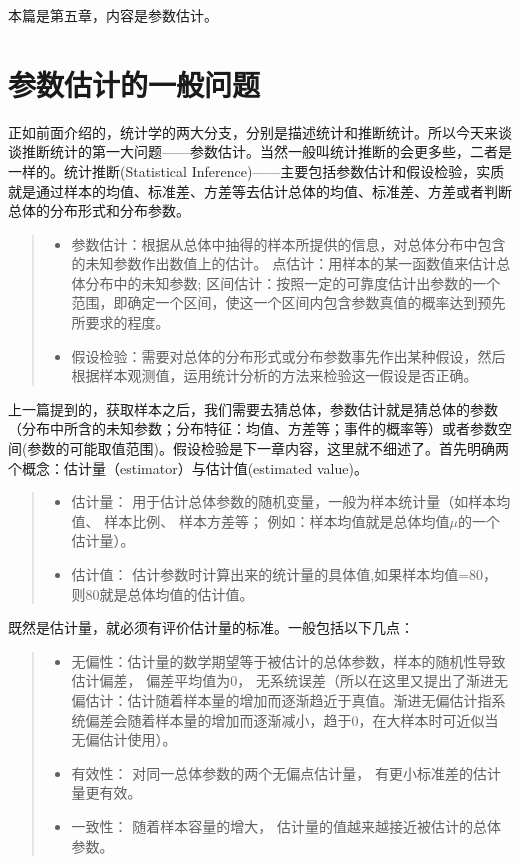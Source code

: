 \documentclass[]{ctexbook}
\providecommand{\tightlist}{%
  \setlength{\itemsep}{0pt}\setlength{\parskip}{0pt}}
\begin{document}
本篇是第五章，内容是参数估计。

\hypertarget{ux53c2ux6570ux4f30ux8ba1ux7684ux4e00ux822cux95eeux9898}{%
\section{参数估计的一般问题}\label{ux53c2ux6570ux4f30ux8ba1ux7684ux4e00ux822cux95eeux9898}}

正如前面介绍的，统计学的两大分支，分别是描述统计和推断统计。所以今天来谈谈推断统计的第一大问题------参数估计。当然一般叫统计推断的会更多些，二者是一样的。统计推断(Statistical Inference)------主要包括参数估计和假设检验，实质就是通过样本的均值、标准差、方差等去估计总体的均值、标准差、方差或者判断总体的分布形式和分布参数。

\begin{quote}
\begin{itemize}
\tightlist
\item
  参数估计：根据从总体中抽得的样本所提供的信息，对总体分布中包含的未知参数作出数值上的估计。
  点估计：用样本的某一函数值来估计总体分布中的未知参数;
  区间估计：按照一定的可靠度估计出参数的一个范围，即确定一个区间，使这一个区间内包含参数真值的概率达到预先所要求的程度。
\item
  假设检验：需要对总体的分布形式或分布参数事先作出某种假设，然后根据样本观测值，运用统计分析的方法来检验这一假设是否正确。
\end{itemize}
\end{quote}

上一篇提到的，获取样本之后，我们需要去猜总体，参数估计就是猜总体的参数（分布中所含的未知参数；分布特征：均值、方差等；事件的概率等）或者参数空间(参数的可能取值范围)。假设检验是下一章内容，这里就不细述了。首先明确两个概念：估计量（estimator）与估计值(estimated value)。

\begin{quote}
\begin{itemize}
\tightlist
\item
  估计量： 用于估计总体参数的随机变量，一般为样本统计量（如样本均值、 样本比例、 样本方差等； 例如：样本均值就是总体均值\(\mu\)的一个估计量）。
\item
  估计值： 估计参数时计算出来的统计量的具体值,如果样本均值=80， 则80就是总体均值的估计值。
\end{itemize}
\end{quote}

既然是估计量，就必须有评价估计量的标准。一般包括以下几点：

\begin{quote}
\begin{itemize}
\tightlist
\item
  无偏性：估计量的数学期望等于被估计的总体参数，样本的随机性导致估计偏差， 偏差平均值为0， 无系统误差（所以在这里又提出了渐进无偏估计：估计随着样本量的增加而逐渐趋近于真值。渐进无偏估计指系统偏差会随着样本量的增加而逐渐减小，趋于0，在大样本时可近似当无偏估计使用）。
\item
  有效性： 对同一总体参数的两个无偏点估计量， 有更小标准差的估计量更有效。
\item
  一致性： 随着样本容量的增大， 估计量的值越来越接近被估计的总体参数。
\end{itemize}
\end{quote}
\end{document}
